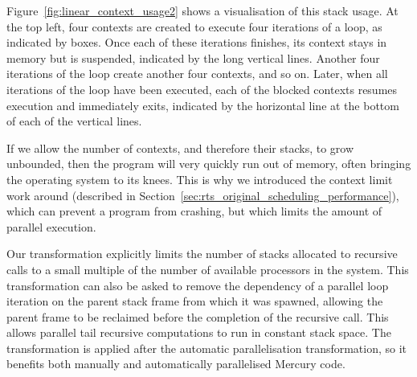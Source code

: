 
Figure~\ref{fig:linear_context_usage2} shows a visualisation of this stack
usage.
At the top left,
four contexts are created to execute four iterations of a loop,
as indicated by boxes.
Once each of these iterations finishes,
its context stays in memory but is suspended,
indicated by the long vertical lines.
Another four iterations of the loop create another four contexts, and so on.
Later, when all iterations of the loop have been executed,
each of the blocked contexts resumes execution and immediately exits,
indicated by the horizontal line at the bottom of each of the vertical
lines.

If we allow the number of contexts, and therefore their stacks, to grow
unbounded, then the program will very quickly run out of memory,
often bringing the operating system to its knees.
This is why we introduced the context limit work around
(described in Section~\ref{sec:rts_original_scheduling_performance}),
which can prevent a program from crashing,
but which limits the amount of parallel execution.

%

Our transformation explicitly limits
the number of stacks allocated to recursive calls
to a small multiple of the number of available processors in the system.
This transformation can also be asked
to remove the dependency of a parallel loop iteration
on the parent stack frame from which it was spawned,
allowing the parent frame to be reclaimed
before the completion of the recursive call.
This allows parallel tail recursive computations
to run in constant stack space.
The transformation is applied
after the automatic parallelisation transformation,
so it benefits both manually and automatically parallelised Mercury code.


